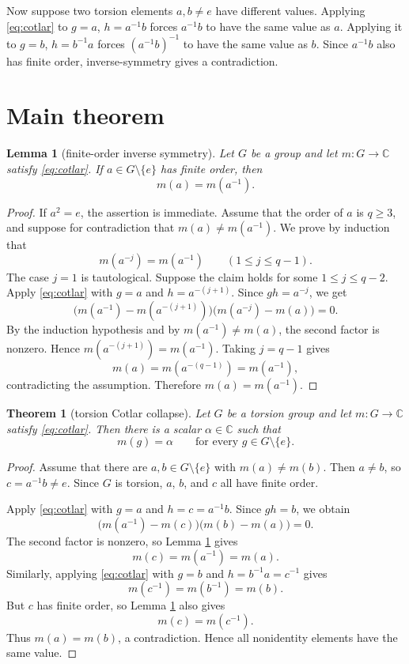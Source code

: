\documentclass[11pt]{article}
\newtheorem{theorem}{Theorem}
\newtheorem{lemma}{Lemma}
\begin{document}
Now suppose two torsion elements \(a,b\ne e\) have different values. Applying
\eqref{eq:cotlar} to \(g=a\), \(h=a^{-1}b\) forces \(a^{-1}b\) to have the
same value as \(a\). Applying it to \(g=b\), \(h=b^{-1}a\) forces
\((a^{-1}b)^{-1}\) to have the same value as \(b\). Since \(a^{-1}b\) also has
finite order, inverse-symmetry gives a contradiction.

\section*{Main theorem}

\begin{lemma}[finite-order inverse symmetry]
\label{lem:inverse}
Let \(G\) be a group and let \(m:G\to\mathbb C\) satisfy
\eqref{eq:cotlar}. If \(a\in G\setminus\{e\}\) has finite order, then
\[
  m(a)=m(a^{-1}).
\]
\end{lemma}

\begin{proof}
If \(a^2=e\), the assertion is immediate. Assume that the order of \(a\) is
\(q\ge 3\), and suppose for contradiction that \(m(a)\ne m(a^{-1})\).
We prove by induction that
\[
  m(a^{-j})=m(a^{-1}) \qquad (1\le j\le q-1).
\]
The case \(j=1\) is tautological. Suppose the claim holds for some
\(1\le j\le q-2\). Apply \eqref{eq:cotlar} with \(g=a\) and
\(h=a^{-(j+1)}\). Since \(gh=a^{-j}\), we get
\[
  \bigl(m(a^{-1})-m(a^{-(j+1)})\bigr)
  \bigl(m(a^{-j})-m(a)\bigr)=0.
\]
By the induction hypothesis and by \(m(a^{-1})\ne m(a)\), the second factor
is nonzero. Hence \(m(a^{-(j+1)})=m(a^{-1})\).
Taking \(j=q-1\) gives
\[
  m(a)=m(a^{-(q-1)})=m(a^{-1}),
\]
contradicting the assumption. Therefore \(m(a)=m(a^{-1})\).
\end{proof}

\begin{theorem}[torsion Cotlar collapse]
\label{thm:torsion}
Let \(G\) be a torsion group and let \(m:G\to\mathbb C\) satisfy
\eqref{eq:cotlar}. Then there is a scalar \(\alpha\in\mathbb C\) such that
\[
  m(g)=\alpha \qquad \text{for every } g\in G\setminus\{e\}.
\]
\end{theorem}

\begin{proof}
Assume that there are \(a,b\in G\setminus\{e\}\) with \(m(a)\ne m(b)\).
Then \(a\ne b\), so \(c=a^{-1}b\ne e\). Since \(G\) is torsion, \(a\), \(b\),
and \(c\) all have finite order.

Apply \eqref{eq:cotlar} with \(g=a\) and \(h=c=a^{-1}b\). Since \(gh=b\), we
obtain
\[
  \bigl(m(a^{-1})-m(c)\bigr)\bigl(m(b)-m(a)\bigr)=0.
\]
The second factor is nonzero, so Lemma \ref{lem:inverse} gives
\[
  m(c)=m(a^{-1})=m(a).
\]
Similarly, applying \eqref{eq:cotlar} with \(g=b\) and
\(h=b^{-1}a=c^{-1}\) gives
\[
  m(c^{-1})=m(b^{-1})=m(b).
\]
But \(c\) has finite order, so Lemma \ref{lem:inverse} also gives
\[
  m(c)=m(c^{-1}).
\]
Thus \(m(a)=m(b)\), a contradiction. Hence all nonidentity elements have the
same value.
\end{proof}
\end{document}
